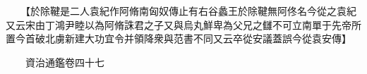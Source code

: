 　　【於除鞬是二人袁紀作阿脩南匈奴傳止有右谷蠡王於除鞬無阿佟名今從之袁紀又云宋由丁鴻尹睦以為阿脩誅君之子又與烏丸鮮卑為父兄之讎不可立南單于先帝所置今首破北虜新建大功宜令并領降衆與范書不同又云卒從安議蓋誤今從袁安傳】

　　資治通鑑卷四十七


    


 


 



 

 
  







 


　　
　　
　
　
　


　　

　















	
	









































 
  



















 





 












  
  
  

 





